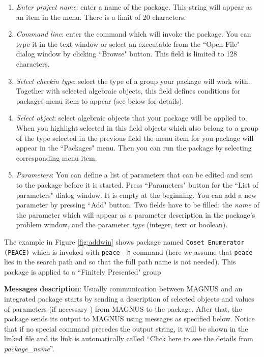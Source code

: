 \documentclass[12pt]{article}
\def\magnus{MAGNUS }
\begin{document}
\begin{enumerate}
\item {\em Enter project name}: enter a name of the package. This
string will appear as an item in the menu. There is a limit of
20 characters.
\item {\em Command line}: enter the command which will invoke
the package. You can type it in the text window or select an
executable from the ``Open File" dialog window by clicking
``Browse" button. This field is limited to 128 characters.
\item {\em Select checkin type}: select the type of a group
your package will work with. Together with selected algebraic
objects, this field defines conditions for packages menu item to
appear (see below for details).
\item {\em Select object}: select algebraic objects
that your package will be applied to. When you  highlight
selected in this field objects which also belong to a group of the
type selected in the previous field the menu item for you package
will appear in the ``Packages" menu. Then you can run the package
by selecting corresponding menu item.
\item {\em Parameters}: You can define a list of parameters that
can be edited and sent to the package before it is started. Press
``Parameters" button for the ``List of parameters" dialog window. It is
empty at the beginning. You can add a new parameter by pressing
``Add" button. Two fields have to be filled: the {\em name} of the parameter
which will appear as a parameter description in the package's
problem window, and the parameter {\em type} (integer, text or boolean).
\end{enumerate}


The example in Figure \ref{fig:addwin} shows package named
\verb+Coset Enumerator (PEACE)+
which is invoked with \verb+peace -h+ command (here we assume that
\verb+peace+ lies in the search path and so that the full path name is not
needed).
This package is applied to a ``Finitely Presented" group


\textbf{Messages description}:
Usually communication between \magnus and an integrated package
starts by sending a description of selected objects and values
of parameters (if necessary )  from \magnus to the package.
After that, the package sends its output to \magnus using messages as
specified below. Notice that if no special command precedes the output
string, it will be shown in the linked file and its link is automatically
called ``Click here to see the details from {\em package\_name}''.
\end{document}
